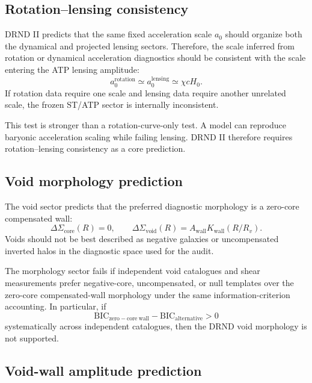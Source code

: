 \documentclass[12pt]{iopart}
\begin{document}
\subsection{Rotation--lensing consistency}

DRND II predicts that the same fixed acceleration scale \(a_0\) should organize both the dynamical and projected lensing sectors. Therefore, the scale inferred from rotation or dynamical acceleration diagnostics should be consistent with the scale entering the ATP lensing amplitude:
\begin{equation}
a_0^{\mathrm{rotation}}
\simeq
a_0^{\mathrm{lensing}}
\simeq
\chi cH_0.
\end{equation}
If rotation data require one scale and lensing data require another unrelated scale, the frozen ST/ATP sector is internally inconsistent.

This test is stronger than a rotation-curve-only test. A model can reproduce baryonic acceleration scaling while failing lensing. DRND II therefore requires rotation--lensing consistency as a core prediction.

\subsection{Void morphology prediction}

The void sector predicts that the preferred diagnostic morphology is a zero-core compensated wall:
\begin{equation}
\Delta\Sigma_{\mathrm{core}}(R)=0,
\qquad
\Delta\Sigma_{\mathrm{void}}(R)
=
A_{\mathrm{wall}}K_{\mathrm{wall}}(R/R_v).
\end{equation}
Voids should not be best described as negative galaxies or uncompensated inverted halos in the diagnostic space used for the audit.

The morphology sector fails if independent void catalogues and shear measurements prefer negative-core, uncompensated, or null templates over the zero-core compensated-wall morphology under the same information-criterion accounting. In particular, if
\begin{equation}
\mathrm{BIC}_{\mathrm{zero-core\ wall}}
-
\mathrm{BIC}_{\mathrm{alternative}}
>
0
\end{equation}
systematically across independent catalogues, then the DRND void morphology is not supported.

\subsection{Void-wall amplitude prediction}
\end{document}
